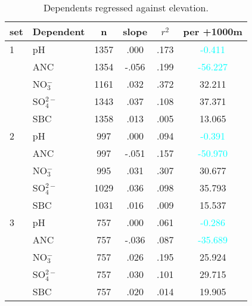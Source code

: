 \begin{table}[htbp]\scriptsize
\centering
\caption[Elevation trends]{Dependents regressed against elevation.}
\begin{tabular}{llcccc}
\toprule
set & Dependent & n & slope&$r^2$&per +1000m \\ 
\midrule
1   & pH               & 1357 & .000 & .173 & \textcolor{cyan}{-0.411} \\ 
     & ANC            & 1354 & -.056 & .199 & \textcolor{cyan}{-56.227}  \\ 
     &  NO$_3^-$ & 1161 & .032 & .372 & 32.211  \\ 
     &  SO$_4^{2-}$& 1343 & .037 & .108 & 37.371  \\ 
     & SBC             & 1358 & .013 & .005 & 13.065 \\ 
\midrule
2   & pH               & 997 & .000 & .094 & \textcolor{cyan}{-0.391}  \\ 
     & ANC            & 997 & -.051 & .157 & \textcolor{cyan}{-50.970} \\ 
     &  NO$_3^-$  & 995 & .031 & .307 & 30.677  \\ 
     &  SO$_4^{2-}$ & 1029 & .036 & .098 & 35.793  \\ 
     & SBC             & 1031 & .016 & .009 & 15.537  \\ 
 \midrule
3   & pH              & 757 & .000 & .061 & \textcolor{cyan}{-0.286}  \\ 
     & ANC           & 757 & -.036 & .087 & \textcolor{cyan}{-35.689}  \\ 
     &  NO$_3^-$ & 757 & .026 & .195 & 25.924  \\ 
     &  SO$_4^{2-}$ & 757 & .030 & .101 & 29.715  \\ 
     & SBC            & 757 & .020 & .014 & 19.905  \\ 
 \bottomrule
\end{tabular}
\label{Water quality per elevation}
\end{table}
